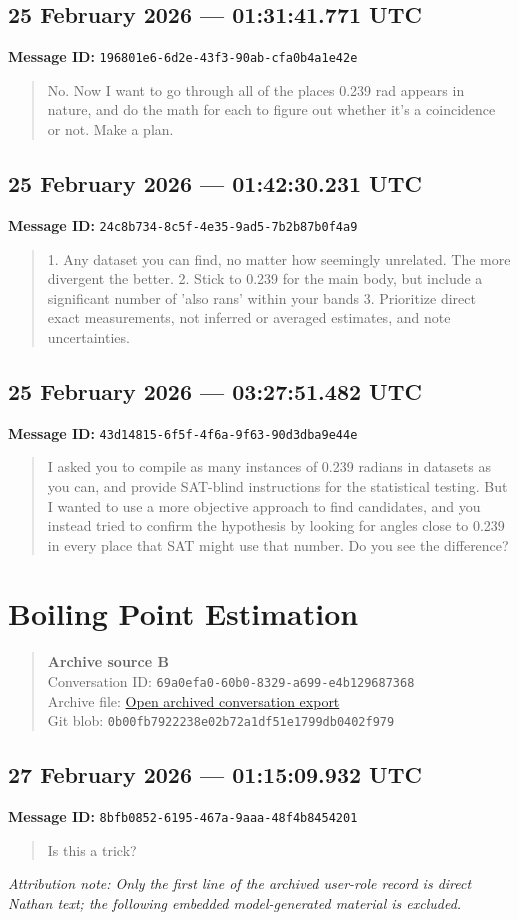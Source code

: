 \documentclass[11pt,letterpaper]{article}
\newcommand{\messageentry}[3]{%
  \Needspace{7\baselineskip}
  \subsection*{#1}
  {\small\textbf{Message ID:} \texttt{#2}}
  \vspace{2pt}
}
\newcommand{\sourceblock}[4]{%
  \begin{quote}\small
  \textbf{#1}\\
  Conversation ID: \texttt{#2}\\
  Archive file: \href{#3}{Open archived conversation export}\\
  Git blob: \texttt{#4}
  \end{quote}
}
\begin{document}
\messageentry{25 February 2026 --- 01:31:41.771 UTC}{196801e6-6d2e-43f3-90ab-cfa0b4a1e42e}{}
\begin{quote}
No. Now I want to go through all of the places 0.239 rad appears in nature, and do the math for each to figure out whether it's a coincidence or not. Make a plan.
\end{quote}

\messageentry{25 February 2026 --- 01:42:30.231 UTC}{24c8b734-8c5f-4e35-9ad5-7b2b87b0f4a9}{}
\begin{quote}
1. Any dataset you can find, no matter how seemingly unrelated. The more divergent the better. 2. Stick to 0.239 for the main body, but include a significant number of 'also rans' within your bands 3. Prioritize direct exact measurements, not inferred or averaged estimates, and note uncertainties.
\end{quote}

\messageentry{25 February 2026 --- 03:27:51.482 UTC}{43d14815-6f5f-4f6a-9f63-90d3dba9e44e}{}
\begin{quote}
I asked you to compile as many instances of 0.239 radians in datasets as you can, and provide SAT-blind instructions for the statistical testing. But I wanted to use a more objective approach to find candidates, and you instead tried to confirm the hypothesis by looking for angles close to 0.239 in every place that SAT might use that number. Do you see the difference?
\end{quote}

\section*{Boiling Point Estimation}
\sourceblock{Archive source B}{69a0efa0-60b0-8329-a699-e4b129687368}{https://github.com/Satobloc/SAT_THEORY_ARCHIVE_2023-25/blob/main/DEVELOPMENT_FULL_CONVOS/7OCT26_A_GRADE_MINEABLES/26.02.26\%E2\%80\%A226.06.01\%E2\%80\%A2\%5BA\%5D\%20Boiling\%20Point\%20Estimation\%20\%E2\%80\%94\%20raw.json}{0b00fb79\hspace{0pt}22238e02\hspace{0pt}b72a1df5\hspace{0pt}1e1799db\hspace{0pt}0402f979}

\messageentry{27 February 2026 --- 01:15:09.932 UTC}{8bfb0852-6195-467a-9aaa-48f4b8454201}{}
\begin{quote}
Is this a trick?
\end{quote}
{\small\emph{Attribution note: Only the first line of the archived user-role record is direct Nathan text; the following embedded model-generated material is excluded.}}
\end{document}
